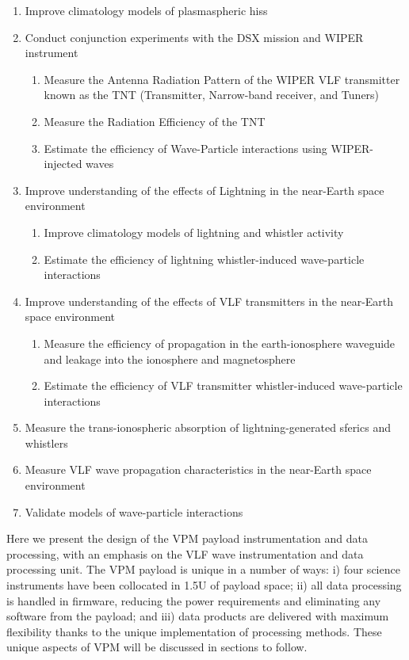 \begin{enumerate}
\item Improve climatology models of plasmaspheric hiss
\item Conduct conjunction experiments with the DSX mission and WIPER instrument
	\begin{enumerate}
	\item Measure the Antenna Radiation Pattern of the WIPER VLF transmitter known as the TNT (Transmitter, Narrow-band receiver, and Tuners)
	\item Measure the Radiation Efficiency of the TNT
	\item Estimate the efficiency of Wave-Particle interactions using WIPER-injected waves
	\end{enumerate}
\item Improve understanding of the effects of Lightning in the near-Earth space environment
	\begin{enumerate}
	\item Improve climatology models of lightning and whistler activity
	\item Estimate the efficiency of lightning whistler-induced wave-particle interactions
	\end{enumerate}
\item Improve understanding of the effects of VLF transmitters in the near-Earth space environment
	\begin{enumerate}
	\item Measure the efficiency of propagation in the earth-ionosphere waveguide and leakage into the ionosphere and magnetosphere
	\item Estimate the efficiency of VLF transmitter whistler-induced wave-particle interactions
	\end{enumerate}
\item Measure the trans-ionospheric absorption of lightning-generated sferics and whistlers
\item Measure VLF wave propagation characteristics in the near-Earth space environment
\item Validate models of wave-particle interactions
\end{enumerate}


Here we present the design of the VPM payload instrumentation and data processing, with an emphasis on the VLF wave instrumentation and data processing unit. The VPM payload is unique in a number of ways: i) four science instruments have been collocated in 1.5U of payload space; ii) all data processing is handled in firmware, reducing the power requirements and eliminating any software from the payload; and iii) data products are delivered with maximum flexibility thanks to the unique implementation of processing methods. These unique aspects of VPM will be discussed in sections to follow.


